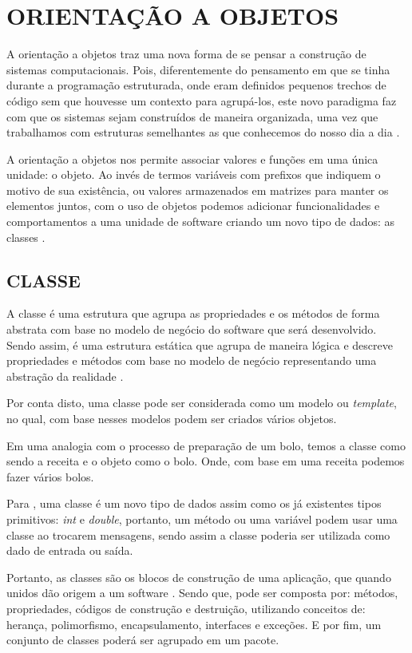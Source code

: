 \chapter{ORIENTAÇÃO A OBJETOS}
\label{orientacaoAObjetos}

A orientação a objetos traz uma nova forma de se pensar a construção de sistemas
computacionais. Pois, diferentemente do pensamento em que se tinha durante a 
programação estruturada, onde eram definidos pequenos trechos de código sem que 
houvesse um contexto para agrupá-los, este novo paradigma faz com que os sistemas 
sejam construídos de maneira organizada, uma vez que trabalhamos com estruturas 
semelhantes as que conhecemos do nosso dia a dia
\cite{phpProgramandoComOrientacaoAObjetos}.

A orientação a objetos nos permite associar valores e funções em uma única
unidade: o objeto. Ao invés de termos variáveis com prefixos que indiquem o 
motivo de sua existência, ou valores armazenados em matrizes para manter os 
elementos juntos, com o uso de objetos podemos adicionar funcionalidades e 
comportamentos a uma unidade de software criando um novo tipo de dados: as 
classes \cite{phpMasterWriteCuttingEdgeCode}.

\section{CLASSE}

A classe é uma estrutura que agrupa as propriedades e os métodos de forma
abstrata com base no modelo de negócio do software que será desenvolvido. 
Sendo assim, é uma estrutura estática que agrupa de maneira lógica e descreve 
propriedades e métodos com base no modelo de negócio representando uma abstração 
da realidade \cite{phpProgramandoComOrientacaoAObjetos}.

Por conta disto, uma classe pode ser considerada como um modelo ou
\textit{template}, no qual, com base nesses modelos podem ser criados vários objetos.

Em uma analogia com o processo de preparação de um bolo, temos a classe como
sendo a receita e o objeto como o bolo. Onde, com base em uma receita podemos fazer 
vários bolos.

Para , uma classe é um novo tipo de dados assim como os já
existentes tipos primitivos: \textit{int} e \textit{double}, portanto, um método
ou uma variável podem usar uma classe ao trocarem mensagens, sendo assim a classe 
poderia ser utilizada como dado de entrada ou saída.

Portanto, as classes são os blocos de construção de uma aplicação, que quando
unidos dão origem a um software \cite{learningJava}. Sendo que, pode ser 
composta por: métodos, propriedades, códigos de construção e destruição, 
utilizando conceitos de: herança, polimorfismo, encapsulamento, interfaces e 
exceções. E por fim, um conjunto de classes poderá ser agrupado em um pacote.

